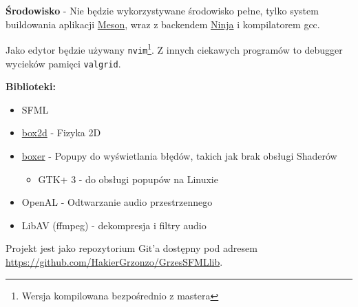 \documentclass[a4paper,12pt]{article}
\begin{document}
\textbf{Środowisko} - Nie będzie wykorzystywane środowisko pełne, tylko system buildowania aplikacji \href{https://mesonbuild.com/}{Meson}, wraz z backendem \href{https://ninja-build.org/}{Ninja} i kompilatorem gcc.

Jako edytor będzie używany \texttt{nvim}\footnote{Wersja kompilowana bezpośrednio z mastera}. Z innych ciekawych programów to debugger wycieków pamięci \texttt{valgrid}.


\vspace{5mm}

\textbf{Biblioteki:}
\begin{itemize}
    \item SFML
    \item \href{https://box2d.org/}{box2d} - Fizyka 2D
    \item \href{https://github.com/aaronmjacobs/Boxer}{boxer} - Popupy do wyświetlania błędów, takich jak brak obsługi Shaderów
    \begin{itemize}
        \item GTK+ 3 - do obsługi popupów na Linuxie
    \end{itemize}
    \item OpenAL - Odtwarzanie audio przestrzennego
    \item LibAV (ffmpeg) - dekompresja i filtry audio
\end{itemize}

\vspace{1cm}

Projekt jest jako repozytorium Git'a dostępny pod adresem \url{https://github.com/HakierGrzonzo/GrzesSFMLlib}.
\end{document}
